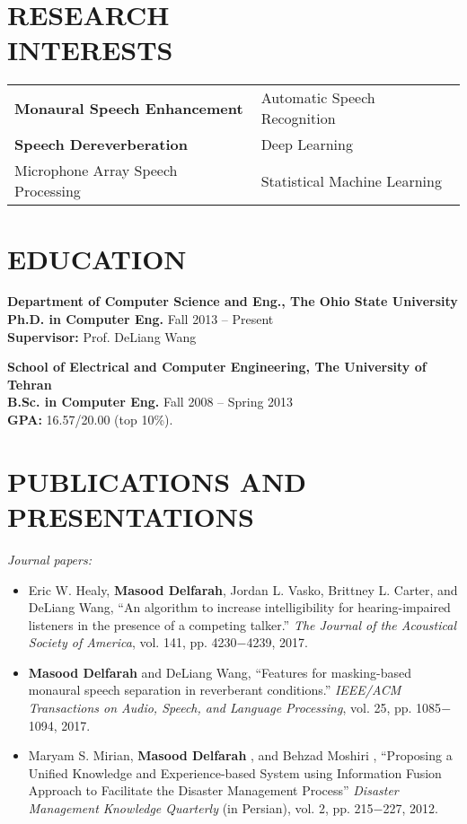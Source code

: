 \documentclass[margin, 10pt]{res}
\begin{document}
\begin{resume}
\section{RESEARCH\\INTERESTS}

\begin{tabular}{l l}
\textbf{Monaural Speech Enhancement}    & \hspace{0.3in}   Automatic Speech Recognition\\ 
\textbf{Speech Dereverberation}    & \hspace{0.3in}    Deep Learning\\ 
Microphone Array Speech Processing  & \hspace{0.3in} Statistical Machine Learning
\end{tabular}

\section{EDUCATION}
\textbf{Department of Computer Science and Eng., The Ohio State University }  \\
\textbf{Ph.D. in Computer Eng.} \hfill Fall 2013 -- Present \\
\textbf{Supervisor:} Prof. DeLiang Wang

\textbf{School of Electrical and Computer Engineering, The University of Tehran}\\
\textbf{B.Sc. in Computer Eng.} \hfill Fall 2008 -- Spring 2013 \\
\textbf{GPA:} 16.57/20.00 (top 10\%).


\section{PUBLICATIONS AND PRESENTATIONS}
\textit{Journal papers:}
\begin{itemize}
\item Eric W. Healy, \textbf{Masood Delfarah}, Jordan L. Vasko, Brittney L. Carter, and DeLiang Wang, ``An algorithm to increase intelligibility for hearing-impaired listeners in the presence of a competing talker.'' \textit{The Journal of the Acoustical Society of America}, vol. 141, pp. 4230$-$4239, 2017.
\item \textbf{Masood Delfarah} and DeLiang Wang, ``Features for masking-based monaural speech separation in reverberant conditions.'' \textit{IEEE/ACM Transactions on Audio, Speech, and Language Processing}, vol. 25, pp. 1085$-$1094, 2017.
\item Maryam S. Mirian, \textbf{Masood Delfarah} , and Behzad Moshiri , ``Proposing a Unified Knowledge and Experience-based System using Information Fusion Approach to Facilitate the Disaster Management Process'' \textit{Disaster Management Knowledge Quarterly} (in Persian), vol. 2, pp. 215$-$227, 2012. 
\end{itemize}


\end{resume}
\end{document}
